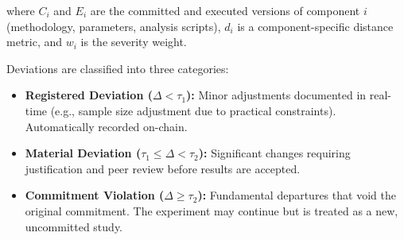 \noindent where $C_i$ and $E_i$ are the committed and executed versions of component $i$ (methodology, parameters, analysis scripts), $d_i$ is a component-specific distance metric, and $w_i$ is the severity weight.

Deviations are classified into three categories:
\begin{itemize}[leftmargin=*]
    \item \textbf{Registered Deviation ($\Delta < \tau_1$):} Minor adjustments documented in real-time (e.g., sample size adjustment due to practical constraints). Automatically recorded on-chain.
    \item \textbf{Material Deviation ($\tau_1 \leq \Delta < \tau_2$):} Significant changes requiring justification and peer review before results are accepted.
    \item \textbf{Commitment Violation ($\Delta \geq \tau_2$):} Fundamental departures that void the original commitment. The experiment may continue but is treated as a new, uncommitted study.
\end{itemize}

